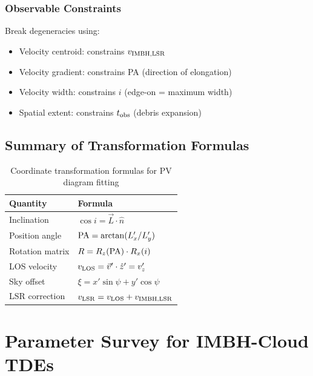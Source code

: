 \documentclass[twocolumn,amsmath,amssymb,prd,superscriptaddress,nofootinbib]{revtex4-2}
\begin{document}
\subsubsection{Observable Constraints}

Break degeneracies using:
\begin{itemize}
    \item Velocity centroid: constrains $v_{\rm IMBH,LSR}$
    \item Velocity gradient: constrains PA (direction of elongation)
    \item Velocity width: constrains $i$ (edge-on = maximum width)
    \item Spatial extent: constrains $t_{\rm obs}$ (debris expansion)
\end{itemize}

\subsection{Summary of Transformation Formulas}
\label{sec:transform_summary}

\begin{table}[h]
\centering
\caption{Coordinate transformation formulas for PV diagram fitting}
\label{tab:transforms}
\begin{tabular}{ll}
\toprule
Quantity & Formula \\
\midrule
Inclination & $\cos i = \vec{L} \cdot \hat{n}$ \\
Position angle & ${\rm PA} = \arctan(L_x'/L_y')$ \\
Rotation matrix & $R = R_z({\rm PA}) \cdot R_x(i)$ \\
LOS velocity & $v_{\rm LOS} = \vec{v}' \cdot \hat{z}' = v_z'$ \\
Sky offset & $\xi = x'\sin\psi + y'\cos\psi$ \\
LSR correction & $v_{\rm LSR} = v_{\rm LOS} + v_{\rm IMBH,LSR}$ \\
\bottomrule
\end{tabular}
\end{table}

\section{Parameter Survey for IMBH-Cloud TDEs}
\label{sec:parameter_survey}
\end{document}
